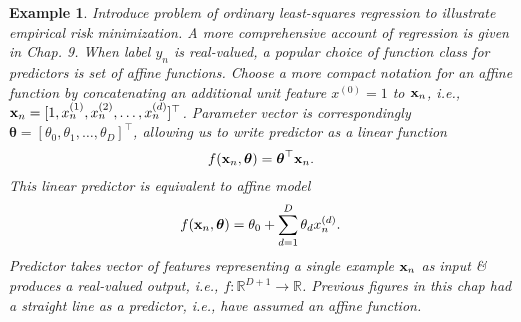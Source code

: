 \documentclass{article}
\newtheorem{example}{Example}
\begin{document}
\begin{itemize}
\begin{itemize}
\begin{itemize}
			\begin{example}
				Introduce problem of ordinary least-squares regression to illustrate empirical risk minimization. A more comprehensive account of regression is given in Chap. 9. When label $y_n$ is real-valued, a popular choice of function class for predictors is set of affine functions. Choose a more compact notation for an affine function by concatenating an additional unit feature $x^{(0)} = 1$ to ${\bf x}_n$, i.e., ${\bf x}_n = [1,x_n^{(1)},x_n^{(2)},\ldots,x_n^{(d)}]^\top$. Parameter vector is correspondingly $\boldsymbol{\theta} = [\theta_0,\theta_1,\ldots,\theta_D]^\top$, allowing us to write predictor as a linear function
				\begin{equation}
					f({\bf x}_n,\boldsymbol{\theta}) = \boldsymbol{\theta}^\top{\bf x}_n.
				\end{equation}
				This linear predictor is equivalent to affine model
				\begin{equation}
					f({\bf x}_n,\boldsymbol{\theta}) = \theta_0 + \sum_{d=1}^D \theta_dx_n^{(d)}.
				\end{equation}
				Predictor takes vector of features representing a single example ${\bf x}_n$ as input \& produces a real-valued output, i.e., $f:\mathbb{R}^{D+1}\to\mathbb{R}$. Previous figures in this chap had a straight line as a predictor, i.e., have assumed an affine function.
				

\end{example}
\end{itemize}
\end{itemize}
\end{itemize}
\end{document}

